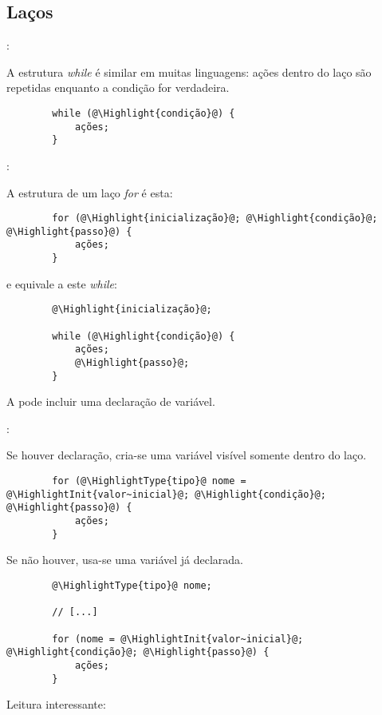 \subsection{Laços}


\begin{frame}[fragile]{\insertsection: \insertsubsection}

	A estrutura \emph{while} é similar em muitas linguagens: ações dentro do laço são repetidas enquanto a condição for verdadeira.
	\begin{verbatim}
		while (@\Highlight{condição}@) {
			ações;
		}
	\end{verbatim}

\end{frame}


\begin{frame}[fragile]{\insertsection: \insertsubsection}

	A estrutura de um laço \emph{for} é esta:
	\begin{verbatim}
		for (@\Highlight{inicialização}@; @\Highlight{condição}@; @\Highlight{passo}@) {
			ações;
		}
	\end{verbatim}
	e equivale a este \emph{while}:
	\begin{verbatim}
		@\Highlight{inicialização}@;

		while (@\Highlight{condição}@) {
			ações;
			@\Highlight{passo}@;
		}
	\end{verbatim}

	A  pode incluir uma declaração de variável.

\end{frame}


\begin{frame}[b,fragile]{\insertsection: \insertsubsection}

	Se houver declaração, cria-se uma variável visível somente dentro do laço.
	\begin{verbatim}
		for (@\HighlightType{tipo}@ nome = @\HighlightInit{valor~inicial}@; @\Highlight{condição}@; @\Highlight{passo}@) {
			ações;
		}
	\end{verbatim}

	Se não houver, usa-se uma variável já declarada.
	\begin{verbatim}
		@\HighlightType{tipo}@ nome;

		// [...]

		for (nome = @\HighlightInit{valor~inicial}@; @\Highlight{condição}@; @\Highlight{passo}@) {
			ações;
		}
	\end{verbatim}

	\vfill
	Leitura interessante: 

\end{frame}


